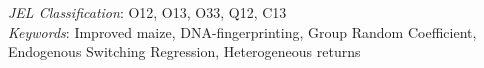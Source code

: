 \documentclass[11pt]{article}
\begin{document}
\begin{titlepage}
\begin{center}
\begin{abstract}
        \end{abstract}\end{center}
        
        {\small \noindent\emph{JEL Classification}: O12, O13, O33, Q12, C13 \\
        	\emph{Keywords}: Improved maize, DNA-fingerprinting, Group Random Coefficient, Endogenous Switching Regression, Heterogeneous returns}

    \end{titlepage}
\maketitle
\newpage


\end{document}
